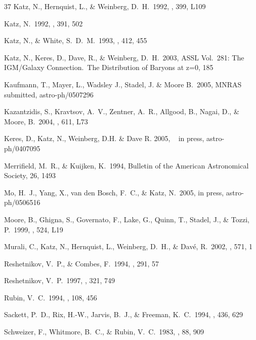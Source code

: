 \documentclass[preprint]{aastex}
\begin{document}
\begin{thebibliography}{37}
 Katz, N., Hernquist, L., 
\& Weinberg, D.~H.\ 1992, \apjl, 399, L109 
  
 Katz, N.\ 1992, \apj, 391, 502 

 Katz, N., \& White, 
S.~D.~M.\ 1993, \apj, 412, 455 
 
 Katz, N., Keres, D., Dave, 
R., \& Weinberg, D.~H.\ 2003, ASSL Vol.~281: The IGM/Galaxy Connection.~The 
Distribution of Baryons at z=0, 185

 Kaufmann, T., Mayer, L., Wadsley
  J., Stadel, J. \& Moore B.\ 2005, MNRAS submitted, astro-ph/0507296

 Kazantzidis, S., 
Kravtsov, A.~V., Zentner, A.~R., Allgood, B., Nagai, D., \& Moore, B.\ 
2004, \apjl, 611, L73 

 Keres, D., Katz, N., Weinberg, D.H. \&
   Dave R. 2005, \mnras~ in press, astro-ph/0407095

 Merrifield, 
M.~R., \& Kuijken, K.\ 1994, Bulletin of the American Astronomical Society, 
26, 1493 
 
 Mo, H.~J., Yang, X., van den Bosch, F.~C., 
\& Katz, N.\ 2005, \mnras in press, astro-ph/0506516

 Moore, B., Ghigna, S., 
Governato, F., Lake, G., Quinn, T., Stadel, J., \& Tozzi, P.\ 1999, \apjl, 
524, L19 
  
 Murali, C., Katz, N., 
Hernquist, L., Weinberg, D.~H., \& Dav{\' e}, R.\ 2002, \apj, 571, 1 

 Reshetnikov, 
V.~P., \& Combes, F.\ 1994, \aap, 291, 57 
 
 Reshetnikov, V.~P.\ 1997, 
\aap, 321, 749 
 
 Rubin, V.~C.\ 1994, \aj, 108, 
456 

 Sackett, P.~D., Rix, 
H.-W., Jarvis, B.~J., \& Freeman, K.~C.\ 1994, \apj, 436, 629 
 
 Schweizer, F., 
Whitmore, B.~C., \& Rubin, V.~C.\ 1983, \aj, 88, 909


\end{thebibliography}
\end{document}
